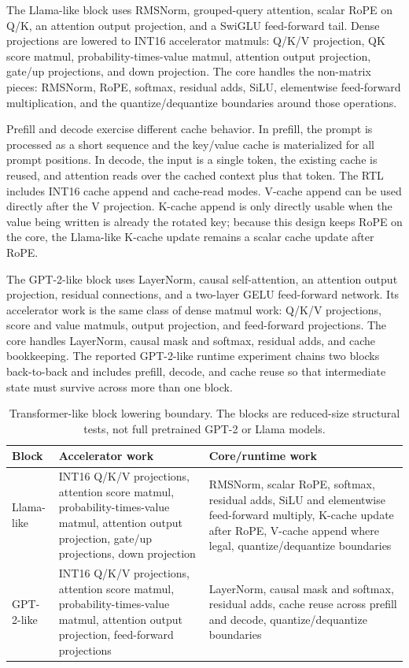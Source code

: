 \documentclass[a4paper, 12pt, titlepage]{article}
\begin{document}
The Llama-like block uses RMSNorm, grouped-query attention, scalar RoPE on Q/K, an attention output projection, and a SwiGLU feed-forward tail. Dense projections are lowered to INT16 accelerator matmuls: Q/K/V projection, QK score matmul, probability-times-value matmul, attention output projection, gate/up projections, and down projection. The core handles the non-matrix pieces: RMSNorm, RoPE, softmax, residual adds, SiLU, elementwise feed-forward multiplication, and the quantize/dequantize boundaries around those operations.

Prefill and decode exercise different cache behavior. In prefill, the prompt is processed as a short sequence and the key/value cache is materialized for all prompt positions. In decode, the input is a single token, the existing cache is reused, and attention reads over the cached context plus that token. The RTL includes INT16 cache append and cache-read modes. V-cache append can be used directly after the V projection. K-cache append is only directly usable when the value being written is already the rotated key; because this design keeps RoPE on the core, the Llama-like K-cache update remains a scalar cache update after RoPE.

The GPT-2-like block uses LayerNorm, causal self-attention, an attention output projection, residual connections, and a two-layer GELU feed-forward network. Its accelerator work is the same class of dense matmul work: Q/K/V projections, score and value matmuls, output projection, and feed-forward projections. The core handles LayerNorm, causal mask and softmax, residual adds, and cache bookkeeping. The reported GPT-2-like runtime experiment chains two blocks back-to-back and includes prefill, decode, and cache reuse so that intermediate state must survive across more than one block.

\begin{table}[H]
    \centering
    \footnotesize
    \caption{Transformer-like block lowering boundary. The blocks are reduced-size structural tests, not full pretrained GPT-2 or Llama models.}
    \label{tab:transformer-lowering}
    \begin{tabularx}{\textwidth}{|l|>{\raggedright\arraybackslash}X|>{\raggedright\arraybackslash}X|}
        \hline
        \textbf{Block} & \textbf{Accelerator work} & \textbf{Core/runtime work} \\
        \hline
        Llama-like & INT16 Q/K/V projections, attention score matmul, probability-times-value matmul, attention output projection, gate/up projections, down projection & RMSNorm, scalar RoPE, softmax, residual adds, SiLU and elementwise feed-forward multiply, K-cache update after RoPE, V-cache append where legal, quantize/dequantize boundaries \\
        \hline
        GPT-2-like & INT16 Q/K/V projections, attention score matmul, probability-times-value matmul, attention output projection, feed-forward projections & LayerNorm, causal mask and softmax, residual adds, cache reuse across prefill and decode, quantize/dequantize boundaries \\
        \hline
    \end{tabularx}
\end{table}
\end{document}
